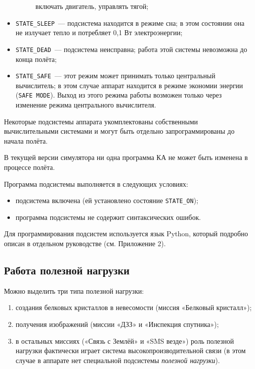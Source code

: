 \documentclass[12pt,a4paper]{article}
\begin{document}
\begin{itemize}
\begin{description}
    включать двигатель, управлять тягой;
  \end{description}
\item \verb'STATE_SLEEP'~--- подсистема находится в режиме сна; в этом состоянии она не
  излучает тепло и потребляет 0,1 Вт электроэнергии;
\item \verb'STATE_DEAD'~--– подсистема неисправна; работа этой системы невозможна до конца
  полёта;
\item \verb'STATE_SAFE'~--– этот режим может принимать только центральный вычислитель; в
  этом случае аппарат находится в режиме экономии энергии (\verb'SAFE MODE'). Выход из этого
  режима работы возможен только через изменение режима центрального вычислителя.
\end{itemize}

Некоторые подсистемы аппарата укомплектованы собственными вычислительными системами и
могут быть отдельно запрограммированы до начала полёта.

В текущей версии симулятора ни одна программа КА не может быть изменена в процессе полёта.

Программа подсистемы выполняется в следующих условиях:

\begin{itemize}
\item подсистема включена (ей установлено состояние \verb'STATE_ON');
\item программа подсистемы не содержит синтаксических ошибок.
\end{itemize}
  
Для программирования подсистем используется язык Python, который подробно описан в
отдельном руководстве (см. Приложение 2).

\subsection{Работа полезной нагрузки}

Можно выделить три типа полезной нагрузки:

\begin{enumerate}
\item создания белковых кристаллов в невесомости (миссия «Белковый кристалл»);
\item получения изображений (миссии «ДЗЗ» и «Инспекция спутника»);
\item в остальных миссиях («Связь с Землёй» и «SMS везде») роль полезной нагрузки
  фактически играет система высокопроизводительной связи (в этом случае в аппарате нет
  специальной подсистемы \emph{полезной нагрузки}).
\end{enumerate}
  
\end{document}
